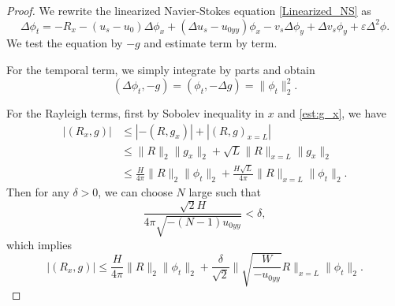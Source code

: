 \documentclass[reqno, 11pt]{amsart}
\theoremstyle{plain}
\theoremstyle{definition}
\theoremstyle{remark}
\numberwithin{equation}{section}
\begin{document}
\begin{proof}
We rewrite the linearized Navier-Stokes equation \eqref{Linearized_NS} as
$$
\Delta \phi_t = - R_x -(u_s - u_0) \Delta \phi_x + (\Delta u_s - u_{0yy}) \phi_x - v_s \Delta \phi_y + \Delta v_s \phi_y + \varepsilon \Delta^2 \phi.
$$
We test the equation by $-g$ and estimate term by term.

For the temporal term, we simply integrate by parts and obtain
\begin{equation}\label{Dual_1}
(\Delta \phi_t, -g) = (\phi_t , - \Delta g) = \| \phi_t\|_2^2.
\end{equation}

For the Rayleigh terms, first by Sobolev inequality in $x$ and \eqref{est:g_x}, we have
\begin{align*}
|(R_x, g)| &\le |-(R,g_x)| + |(R,g)_{x=L}|\\
&\le \|R\|_2 \|g_x\|_2 + \sqrt{L}\|R\|_{x=L}\|g_x\|_2\\
&\le \frac{H}{4\pi} \|R\|_2 \|\phi_t\|_2 + \frac{H\sqrt{L}}{4\pi} \|R\|_{x=L} \| \phi_t\|_2.
\end{align*}
Then for any $\delta > 0$, we can choose $N$ large such that
$$
\frac{\sqrt{2}H}{4\pi \sqrt{-(N-1)u_{0yy}}} < \delta,
$$
which implies
\begin{equation}\label{Dual_2}
|(R_x, g)| \le \frac{H}{4\pi} \|R\|_2 \|\phi_t\|_2 + \frac{\delta}{\sqrt{2}} \| \sqrt{\frac{W}{-u_{0yy}}} R\|_{x= L} \| \phi_t\|_2.
\end{equation}


\end{proof}
\end{document}
